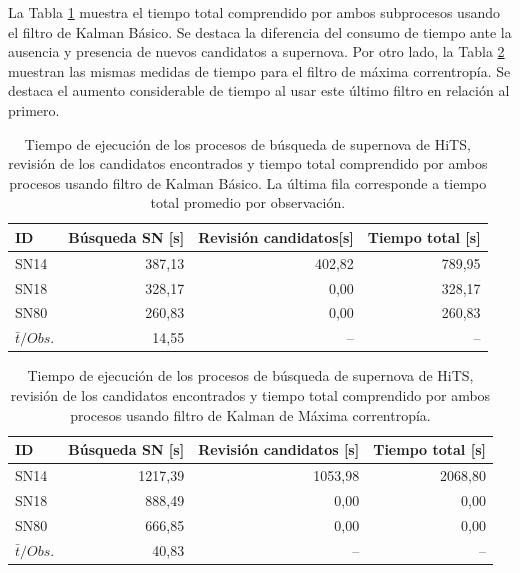 La Tabla \ref{tab:t5} muestra el tiempo total comprendido por ambos subprocesos usando el filtro de Kalman B\'asico. Se destaca la diferencia del consumo de tiempo ante la ausencia y presencia de nuevos candidatos a supernova. Por otro lado, la Tabla \ref{tab:t6} muestran las mismas medidas de tiempo para el filtro de m\'axima correntrop\'ia. Se destaca el aumento considerable de tiempo al usar este \'ultimo filtro en relaci\'on al primero. 
  
\begin{table}[h!]
\centering
\caption{Tiempo de ejecuci\'on de los procesos de b\'usqueda de supernova de HiTS, revisi\'on de los candidatos encontrados y tiempo total comprendido por ambos procesos usando filtro de Kalman B\'asico. La \'ultima fila corresponde a tiempo total promedio por observaci\'on.}
\begin{tabular}{|l|r|r|r|}
\hline
\textbf{ID} & \textbf{B\'usqueda SN [s]} & \textbf{Revisi\'on candidatos[s]} & \textbf{Tiempo total [s]} \\ \hline
\hline
SN14 & 387,13 & 402,82 & 789,95 \\\hline
SN18 & 328,17 & 0,00 & 328,17\\\hline
SN80 & 260,83 & 0,00 & 260,83 \\\hline\hline
 $\bar{t}/Obs. $& 14,55 & -- & --\\\hline 
\end{tabular}
\label{tab:t5}
\end{table}


\begin{table}[h!]
\centering
\caption{Tiempo de ejecuci\'on de los procesos de b\'usqueda de supernova de HiTS, revisi\'on de los candidatos encontrados y tiempo total comprendido por ambos procesos usando filtro de Kalman de M\'axima correntrop\'ia.}
\begin{tabular}{|l|r|r|r|}
\hline
\textbf{ID} & \textbf{B\'usqueda SN [s]} & \textbf{Revisi\'on candidatos [s]} & \textbf{Tiempo total [s]} \\ \hline
\hline
SN14 & 1217,39 & 1053,98 & 2068,80\\\hline
SN18 & 888,49 & 0,00 & 0,00\\\hline
SN80 & 666,85 & 0,00& 0,00\\\hline \hline
 $\bar{t}/Obs. $& 40,83 & -- & --\\\hline 
\end{tabular}
\label{tab:t6}
\end{table}

